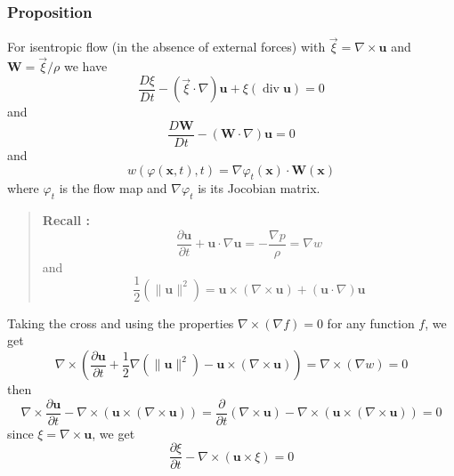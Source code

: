 \subsubsection{Proposition} %

For isentropic flow (in the absence of external forces) with $\vec{\xi} = \nabla \times \textbf{u}$ and $\textbf{W} = \vec{\xi} /\rho$ we have
\begin{equation}
\frac{D\xi}{Dt} - \left(\vec{\xi}\cdot\nabla\right)\textbf{u} + \xi \left(\operatorname{div}\textbf{u}\right) = 0
\end{equation}
and
\begin{equation}
\frac{D\textbf{W} }{Dt} - \left(\textbf{W} \cdot\nabla\right)\textbf{u} = 0
\end{equation}
and
\begin{equation}
w\left(\varphi(\textbf{x},t),t\right) = \nabla \varphi_t(\textbf{x}) \cdot \textbf{W} (\textbf{x})
\end{equation}
where $\varphi_t$ is the flow map and $\nabla \varphi_t$  is its Jocobian matrix.


\begin{quote}
	\textbf{Recall :}
\begin{equation}
\frac{\partial \textbf{u}}{\partial t} + \textbf{u}\cdot\nabla \textbf{u} = -\frac{\nabla p}{\rho} = \nabla w
\end{equation}
and
\begin{equation}
\frac{1}{2}\left(\lVert\textbf{u}\rVert^2\right) = \textbf{u}\times\left(\nabla\times\textbf{u}\right) + \left(\textbf{u}\cdot\nabla\right)\textbf{u}
\end{equation}

\end{quote}
Taking the cross and using the properties $\nabla \times \left(\nabla f\right) = 0$ for any function $f$, we get
\begin{equation}
\nabla\times\left(
\frac{\partial \textbf{u}}{\partial t} + \frac{1}{2}\nabla\left(\lVert \textbf{u}\rVert^2\right) - \textbf{u}\times\left(\nabla \times \textbf{u}\right)\right)
= \nabla\times\left(
\nabla w
\right) = 0
\end{equation}
then
\begin{equation}
\nabla \times \frac{\partial \textbf{u}}{\partial t} - \nabla \times\left(\textbf{u}\times \left(\nabla \times\textbf{u}\right)\right)
=
\frac{\partial}{\partial t}\left( \nabla \times \textbf{u}\right) - \nabla \times\left(\textbf{u}\times \left(\nabla \times\textbf{u}\right)\right)
= 0
\end{equation}
since $\xi = \nabla \times \textbf{u}$, we get
\begin{equation}
\frac{\partial \xi}{\partial t} - \nabla \times\left(\textbf{u}\times \xi\right)
= 0
\end{equation}


